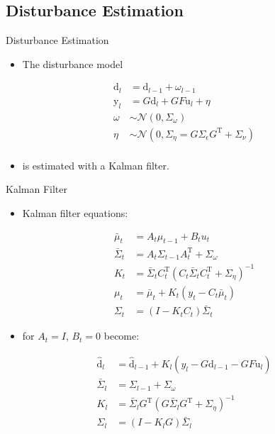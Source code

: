 \documentclass{beamer}
\newcommand{\liftedinput}{\mathrm{u}}
\newcommand{\liftedobs}{\mathrm{y}}
\newcommand{\disturbance}{\mathrm{d}}
\begin{document}
\subsection{Disturbance Estimation}
%
\begin{frame}{Disturbance Estimation}
\begin{itemize}
\item The disturbance model \pause
\linebreak
\end{itemize}
\begin{equation}
\begin{aligned}
\disturbance_l &= \disturbance_{l-1} + \omega_{l-1} \\
\liftedobs_l &= G\disturbance_l + GF\liftedinput_l + \eta \\
\omega &\sim \mathcal{N}(0,\Sigma_{\omega}) \\
\eta &\sim \mathcal{N}(0,\Sigma_{\eta} = G\Sigma_{\epsilon}G^{\mathrm{T}} + \Sigma_{\nu}) \\
\end{aligned}
\end{equation}
\pause
\begin{itemize}
\item is estimated with a Kalman filter. \pause
\end{itemize}
\end{frame}
%
\begin{frame}{Kalman Filter}
\begin{itemize}
\item Kalman filter equations: \pause
\end{itemize}
\begin{equation}
\begin{aligned}
\bar{\mu}_t &= A_t\mu_{t-1} + B_t u_t \\
\bar{\Sigma}_t &= A_t\Sigma_{t-1}A_t^{\mathrm{T}} + \Sigma_{\omega} \\
K_t &= \bar{\Sigma}_t C_t^{\mathrm{T}}(C_t \bar{\Sigma}_t C_t^{\mathrm{T}} + \Sigma_{\eta})^{-1} \\
\mu_t &= \bar{\mu}_t + K_t (y_t - C_t \bar{\mu}_t) \\
\Sigma_t &= (I - K_t C_t)\bar{\Sigma}_t
\end{aligned}
\end{equation}
\pause
\begin{itemize}
\item for $A_t = I$, $B_t = 0$ become: \pause
\linebreak
\end{itemize}
\begin{equation}
\begin{aligned}
\hat{\disturbance}_l &= \hat{\disturbance}_{l-1} + K_{l}(y_l - G\hat{\disturbance}_{l-1} - GF\liftedinput_l) \\
\bar{\Sigma}_l &= \Sigma_{l-1} + \Sigma_{\omega} \\
K_l &= \bar{\Sigma}_l G^{\mathrm{T}}(G\bar{\Sigma}_l G^{\mathrm{T}} + \Sigma_{\eta})^{-1} \\
\Sigma_{l} &= (I - K_l G)\bar{\Sigma}_l
\end{aligned}
\end{equation}
\end{frame}
%
\end{document}
